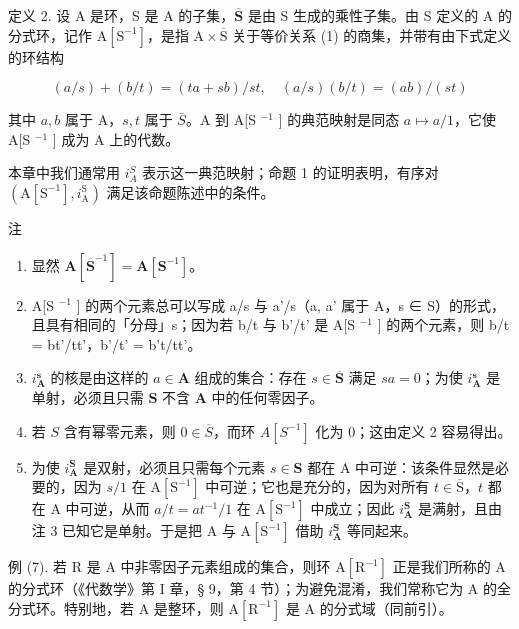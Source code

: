 定义 2. 设 A 是环，S 是 A 的子集，\(\overline{\mathbf{S}}\) 是由 S 生成的乘性子集。由 S 定义的 A 的分式环，记作 \(\mathrm{A}[\mathrm{S}^{-1}]\)，是指 \(\mathrm{A} \times \overline{\mathrm{S}}\) 关于等价关系 (1) 的商集，并带有由下式定义的环结构

\[
(a / s) + (b / t) = (t a + s b) / s t, \quad (a / s) (b / t) = (a b) / (s t)
\]

其中 \(a, b\) 属于 A，\(s, t\) 属于 \(\bar{S}\)。A 到 A{[}S \(^{-1}\) {]} 的典范映射是同态 \(a \mapsto a/1\)，它使 A{[}S \(^{-1}\) {]} 成为 A 上的代数。

本章中我们通常用 \(i_{A}^{S}\) 表示这一典范映射；命题 1 的证明表明，有序对 \((\mathrm{A}[\mathrm{S}^{-1}], i_{\mathrm{A}}^{\mathrm{S}})\) 满足该命题陈述中的条件。

注

\begin{enumerate}
\def\labelenumi{(\arabic{enumi})}
\item
  显然 \(\mathbf{A}[\overline{\mathbf{S}}^{-1}] = \mathbf{A}[\mathbf{S}^{-1}]\)。
\item
  A{[}S \(^{-1}\) {]} 的两个元素总可以写成 a/s 与 a'/s（a, a' 属于 A，s ∈ S）的形式，且具有相同的「分母」s；因为若 b/t 与 b'/t' 是 A{[}S \(^{-1}\) {]} 的两个元素，则 b/t = bt'/tt'，b'/t' = b't/tt'。
\item
  \(i_{\mathbf{A}}^{\mathbf{s}}\) 的核是由这样的 \(a \in \mathbf{A}\) 组成的集合：存在 \(s \in \overline{\mathbf{S}}\) 满足 \(sa = 0\)；为使 \(i_{\mathbf{A}}^{\mathbf{s}}\) 是单射，必须且只需 \(\mathbf{S}\) 不含 \(\mathbf{A}\) 中的任何零因子。
\item
  若 \(S\) 含有幂零元素，则 \(0 \in \overline{S}\)，而环 \(A[S^{-1}]\) 化为 0；这由定义 2 容易得出。
\item
  为使 \(i_{\mathbf{A}}^{\mathbf{S}}\) 是双射，必须且只需每个元素 \(s \in \mathbf{S}\) 都在 A 中可逆：该条件显然是必要的，因为 \(s/1\) 在 \(\mathrm{A}[\mathrm{S}^{-1}]\) 中可逆；它也是充分的，因为对所有 \(t \in \overline{\mathrm{S}}\)，\(t\) 都在 A 中可逆，从而 \(a/t = at^{-1}/1\) 在 \(\mathrm{A}[\mathrm{S}^{-1}]\) 中成立；因此 \(i_{\mathbf{A}}^{\mathbf{S}}\) 是满射，且由注 3 已知它是单射。于是把 A 与 \(\mathrm{A}[\mathrm{S}^{-1}]\) 借助 \(i_{\mathbf{A}}^{\mathbf{S}}\) 等同起来。
\end{enumerate}

例 (7). 若 R 是 A 中非零因子元素组成的集合，则环 \(\mathrm{A}[\mathrm{R}^{-1}]\) 正是我们所称的 A 的分式环（《代数学》第 I 章，§ 9，第 4 节）；为避免混淆，我们常称它为 A 的全分式环。特别地，若 A 是整环，则 \(\mathrm{A}[\mathrm{R}^{-1}]\) 是 A 的分式域（同前引）。


